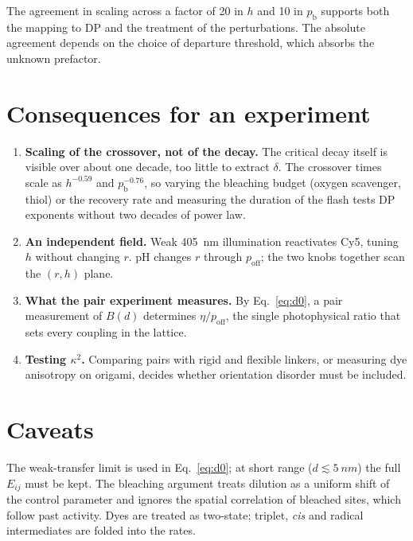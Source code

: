 \documentclass[11pt,a4paper]{article}
\newcommand{\poff}{p_{\mathrm{off}}}
\newcommand{\pb}{p_{\mathrm{b}}}
\begin{document}
The agreement in scaling across a factor of 20 in $h$ and 10 in $\pb$ supports
both the mapping to DP and the treatment of the perturbations. The absolute
agreement depends on the choice of departure threshold, which absorbs the
unknown prefactor.

\section{Consequences for an experiment}

\begin{enumerate}
  \item \textbf{Scaling of the crossover, not of the decay.} The critical decay
  itself is visible over about one decade, too little to extract $\delta$.
  The crossover times scale as $h^{-0.59}$ and $\pb^{-0.76}$, so varying
  the bleaching budget (oxygen scavenger, thiol) or the recovery rate and
  measuring the duration of the flash tests DP exponents without two decades of
  power law.
  \item \textbf{An independent field.} Weak \SI{405}{nm} illumination
  reactivates Cy5, tuning $h$ without changing $r$. pH changes $r$ through
  $\poff$; the two knobs together scan the $(r,h)$ plane.
  \item \textbf{What the pair experiment measures.} By Eq.~\eqref{eq:d0}, a pair
  measurement of $B(d)$ determines $\eta/\poff$, the single photophysical ratio
  that sets every coupling in the lattice.
  \item \textbf{Testing $\kappa^2$.} Comparing pairs with rigid and flexible
  linkers, or measuring dye anisotropy on origami, decides whether orientation
  disorder must be included.
\end{enumerate}

\section*{Caveats}
The weak-transfer limit is used in Eq.~\eqref{eq:d0}; at short range
($d\lesssim\SI{5}{nm}$) the full $E_{ij}$ must be kept. The bleaching argument
treats dilution as a uniform shift of the control parameter and ignores the
spatial correlation of bleached sites, which follow past activity. Dyes are
treated as two-state; triplet, \emph{cis} and radical intermediates are folded
into the rates.
\end{document}
